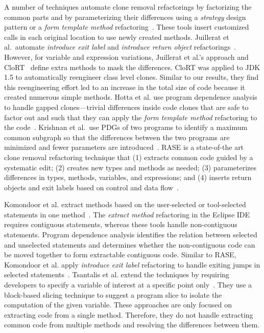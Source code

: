 \documentclass[runningheads,a4paper]{llncs}
\begin{document}
A number of techniques automate clone removal refactorings by factorizing the common parts and by parameterizing their differences using a {\em strategy} design pattern or a {\em form template method} refactoring~\cite{Balazinska1999, Tairas2012:CeDAR, Juillerat2007, Higo:2012, Tsantalis2013:icsm}. These tools insert customized calls in each original location to use newly created methods. Juillerat et al.~automate {\em introduce exit label} and {\em introduce return object} refactorings~\cite{Juillerat2007}. However, for variable and expression variations, Juillerat et al.'s approach and CloRT~\cite{Balazinska1999} define extra methods to mask the differences. CloRT was applied to JDK 1.5 to automatically reengineer class level clones. Similar to our results, they find this reengineering effort led to an increase in the total size of code because it created numerous simple methods. Hotta et al.\/ use program dependence analysis to handle gapped clones---trivial differences inside code clones that are safe to factor out and such that they can apply the {\em form template method} refactoring to the code~\cite{Higo:2012}. Krishnan et al.~use PDGs of two programs to identify a maximum common subgraph so that the differences between the two programs are minimized and fewer parameters are introduced~\cite{Tsantalis2013:icsm}. RASE is a state-of-the art clone removal refactoring technique that (1) extracts common code guided by a systematic  edit; (2) creates new types and methods as needed; (3) parameterizes differences in types, methods, variables, and expressions; and (4) inserts return objects and exit labels based on control and data flow~\cite{Meng2015:rase}. 

 Komondoor et al.\/ extract methods based on the user-selected or tool-selected statements in one method~\cite{Komondoor2000, Komondoor:2003}. The {\em extract method} refactoring in the Eclipse IDE requires contiguous statements, whereas these tools handle non-contiguous statements. Program dependence analysis identifies the relation between selected and unselected statements and determines whether the non-contiguous code can be moved together to form extractable contiguous code. Similar to RASE, Komondoor et al.\/ apply {\em introduce exit label} refactoring to handle exiting jumps in selected statements~\cite{Komondoor:2003}. Tsantalis et al.\/ extend the techniques by requiring developers to specify a variable of interest at a specific point only~\cite{Tsantalis2011:extract}. They use a block-based slicing technique to suggest a program slice to isolate the computation of the given variable. These approaches are only focused on extracting code from a single method. Therefore, they do not handle extracting common code from multiple methods and resolving the differences between them. 
\end{document}
